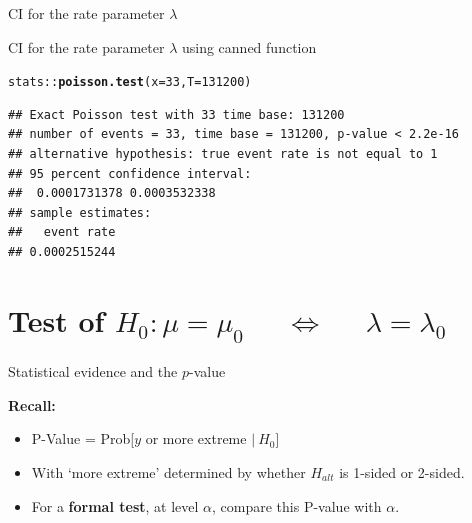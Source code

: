 \documentclass[10pt,handout]{beamer}\usepackage[]{graphicx}\usepackage[]{color}
\makeatletter
\newcommand{\hlnum}[1]{\textcolor[rgb]{0.686,0.059,0.569}{#1}}%
\newcommand{\hlopt}[1]{\textcolor[rgb]{0,0,0}{#1}}%
\newcommand{\hlstd}[1]{\textcolor[rgb]{0.345,0.345,0.345}{#1}}%
\newcommand{\hlkwc}[1]{\textcolor[rgb]{0.333,0.667,0.333}{#1}}%
\newcommand{\hlkwd}[1]{\textcolor[rgb]{0.737,0.353,0.396}{\textbf{#1}}}%
\newenvironment{kframe}{%
 \def\at@end@of@kframe{}%
 \ifinner\ifhmode%
  \def\at@end@of@kframe{\end{minipage}}%
  \begin{minipage}{\columnwidth}%
 \fi\fi%
 \def\FrameCommand##1{\hskip\@totalleftmargin \hskip-\fboxsep
 \colorbox{shadecolor}{##1}\hskip-\fboxsep
     \hskip-\linewidth \hskip-\@totalleftmargin \hskip\columnwidth}%
 \MakeFramed {\advance\hsize-\width
   \@totalleftmargin\z@ \linewidth\hsize
   \@setminipage}}%
 {\par\unskip\endMakeFramed%
 \at@end@of@kframe}
\newenvironment{knitrout}{}{} %
\makeatother
\begin{document}
\begin{frame}[fragile]{CI for the rate  parameter $\lambda$}
\begin{itemize}
		
	\end{itemize}
	
\end{frame}


\begin{frame}[fragile]{CI for the rate  parameter $\lambda$ using canned function}
	
\begin{knitrout}\tiny
{}\color{fgcolor}\begin{kframe}
\begin{alltt}
\hlstd{stats}\hlopt{::}\hlkwd{poisson.test}\hlstd{(}\hlkwc{x} \hlstd{=} \hlnum{33}\hlstd{,} \hlkwc{T} \hlstd{=} \hlnum{131200}\hlstd{)}
\end{alltt}
\begin{verbatim}
## Exact Poisson test with 33 time base: 131200 
## number of events = 33, time base = 131200, p-value < 2.2e-16
## alternative hypothesis: true event rate is not equal to 1 
## 95 percent confidence interval:
##  0.0001731378 0.0003532338 
## sample estimates:
##   event rate 
## 0.0002515244
\end{verbatim}
\end{kframe}
\end{knitrout}
	
\end{frame}



\section{Test of $H_{0}: \mu = \mu_{0}$ $\quad \Leftrightarrow \quad$ $\lambda = \lambda_{0}$}


\begin{frame}{Statistical evidence and the $p$-value}
	
	\textbf{Recall:}
	
	\vspace*{1cm}
	
	\begin{itemize}
		\setlength\itemsep{1.2em}
		\item P-Value = Prob[$y$ or more extreme $ |\:H_{0}$]
		
		\item With `more extreme' determined by whether $H_{alt}$ is  1-sided or 2-sided. 
		
		\item For a \textbf{formal test}, at level $\alpha$, compare this P-value with $\alpha$.
	\end{itemize}
	
\end{frame}
\end{document}

